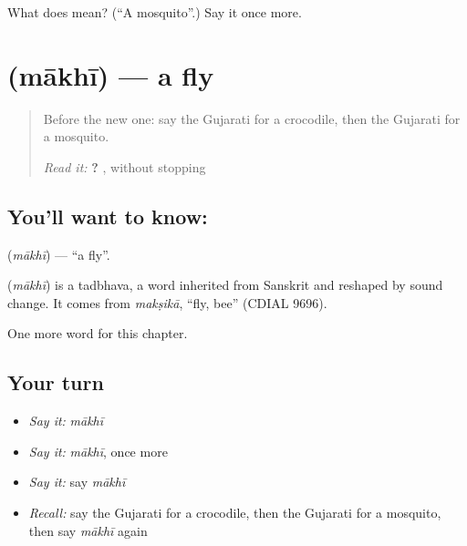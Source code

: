 \begin{tcolorbox}[breakable,colback=teal!4,colframe=teal!35!black,title={Before you move on}]
What does  mean? (\textquotedblleft{}A mosquito\textquotedblright{}.) Say it once more.
\end{tcolorbox}
\section[\texorpdfstring{\gu{માખી} (mākhī)}{માખી (mākhī)}]{ (mākhī) — a fly}

\label{lesson:GU-C123-makhi}



\begin{quote}
Before the new one: say the Gujarati for a crocodile, then the Gujarati for a mosquito.

\emph{Read it:} \textbf{   ?    }, without stopping
\end{quote}

\subsection*{You'll want to know: }
\textbf{} (\emph{mākhī}) — \textquotedblleft{}a fly\textquotedblright{}.

\begin{cousinweb}
\textbf{} (\emph{mākhī}) is a tadbhava, a word inherited from Sanskrit and reshaped by sound change. It comes from \emph{makṣikā}, \textquotedblleft{}fly, bee\textquotedblright{} (CDIAL 9696).
\end{cousinweb}

\begin{grammarlens}[title={What you've built}]
One more word for this chapter.
\end{grammarlens}

\subsection*{Your turn}
\begin{itemize}
\raggedright
  \item \emph{Say it:} \emph{mākhī}
  \item \emph{Say it:} \emph{mākhī}, once more
  \item \emph{Say it:} say \emph{mākhī}
  \item \emph{Recall:} say the Gujarati for a crocodile, then the Gujarati for a mosquito, then say \emph{mākhī} again
\end{itemize}

